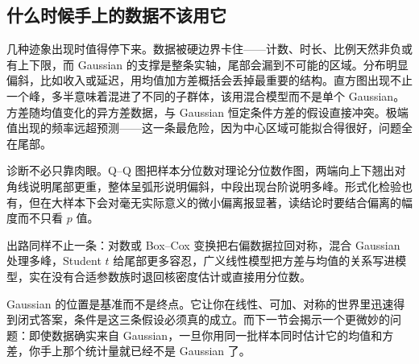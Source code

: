 \subsection{什么时候手上的数据不该用它}

几种迹象出现时值得停下来。数据被硬边界卡住——计数、时长、比例天然非负或有上下限，而 Gaussian 的支撑是整条实轴，尾部会漏到不可能的区域。分布明显偏斜，比如收入或延迟，用均值加方差概括会丢掉最重要的结构。直方图出现不止一个峰，多半意味着混进了不同的子群体，该用混合模型而不是单个 Gaussian。方差随均值变化的异方差数据，与 Gaussian 恒定条件方差的假设直接冲突。极端值出现的频率远超预测——这一条最危险，因为中心区域可能拟合得很好，问题全在尾部。

诊断不必只靠肉眼。Q--Q 图把样本分位数对理论分位数作图，两端向上下翘出对角线说明尾部更重，整体呈弧形说明偏斜，中段出现台阶说明多峰。形式化检验也有，但在大样本下会对毫无实际意义的微小偏离报显著，读结论时要结合偏离的幅度而不只看 \(p\) 值。

出路同样不止一条：对数或 Box--Cox 变换把右偏数据拉回对称，混合 Gaussian 处理多峰，Student \(t\) 给尾部更多容忍，广义线性模型把方差与均值的关系写进模型，实在没有合适参数族时退回核密度估计或直接用分位数。

Gaussian 的位置是基准而不是终点。它让你在线性、可加、对称的世界里迅速得到闭式答案，条件是这三条假设必须真的成立。而下一节会揭示一个更微妙的问题：即使数据确实来自 Gaussian，一旦你用同一批样本同时估计它的均值和方差，你手上那个统计量就已经不是 Gaussian 了。
